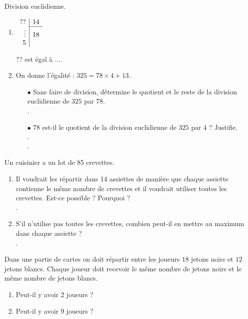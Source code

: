 \documentclass[a4paper]{article}
\begin{document}
\begin{question}[(3 points)] Division euclidienne.
	\begin{enumerate}
		\item \renewcommand{\arraystretch}{1.3}
		      $
			      \begin{array}{r|r}
				      ??     & 14 \\
				      \cline{2-2}
				      \vdots & 18 \\
				      5      &
			      \end{array}
		      $ \renewcommand{\arraystretch}{1}

		      $??$ est égal à ....
		\item On donne l’égalité : $325 = 78 × 4 + 13$.

		      \begin{itemize}
			      \setlength\itemsep{0.4em}
			      \item[$\bullet$] Sans faire de division, détermine le quotient et le reste de la division euclidienne de $325$ par $78$. \\[0.3cm]
			            .\dotfill
			      \item[$\bullet$] $78$ est-il le quotient de la division euclidienne de $325$ par $4$ ? Justifie. \\[0.3cm]
			            .\dotfill \\[0.3cm]
			            .\dotfill
		      \end{itemize}
	\end{enumerate}
\end{question}

\begin{question}[(2.5 points)]

	Un cuisinier a un lot de 85 crevettes.
	\begin{enumerate}
		\item Il voudrait les répartir dans 14 assiettes de manière que chaque assiette contienne le même nombre de crevettes et il voudrait utiliser toutes les crevettes. Est-ce possible ? Pourquoi ? \\[0.3cm]
		      .\dotfill
		\item S’il n’utilise pas toutes les crevettes, combien peut-il en mettre au maximum dans chaque assiette ? \\[0.3cm]
		      .\dotfill
	\end{enumerate}
\end{question}

\begin{question}[(2 points)]
	Dans une partie de cartes on doit répartir entre les joueurs $18$ jetons noirs et $12$ jetons blancs. Chaque joueur doit recevoir le même nombre de jetons noirs et le même nombre de jetons blancs.
	\begin{enumerate}
		\item Peut-il y avoir $2$ joueurs ?
		\item Peut-il y avoir $9$ joueurs ?
	\end{enumerate}
\end{question}
\end{document}
